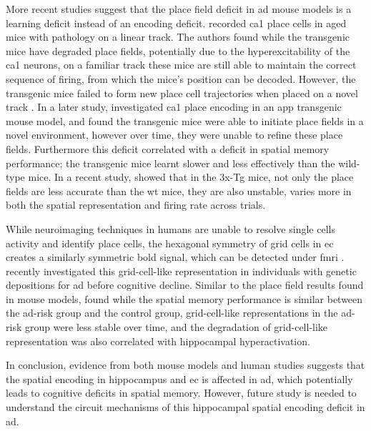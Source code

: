 More recent studies suggest that the place field deficit in \gls{ad} mouse models is a learning deficit instead of an encoding deficit. \citet{cheng13} recorded \gls{ca1} place cells in aged mice with \atau{} pathology on a linear track. The authors found while the transgenic mice have degraded place fields, potentially due to the hyperexcitability of the \gls{ca1} neurons, on a familiar track these mice are still able to maintain the correct sequence of firing, from which the mice's position can be decoded. However, the transgenic mice failed to form new place cell trajectories when placed on a novel track \citep{cheng13}. In a later study, \citet{zhao14} investigated \gls{ca1} place encoding in an \gls{app} transgenic mouse model, and found the transgenic mice were able to initiate place fields in a novel environment, however over time, they were unable to refine these place fields. Furthermore this deficit correlated with a deficit in spatial memory performance; the transgenic mice learnt slower and less effectively than the wild-type mice. In a recent study, \citet{mably17} showed that in the 3x-Tg mice, not only the place fields are less accurate than the \gls{wt} mice, they are also unstable, varies more in both the spatial representation and firing rate across trials. 

While neuroimaging techniques in humans are unable to resolve single cells activity and identify place cells, the hexagonal symmetry of grid cells in \gls{ec} creates a similarly symmetric \gls{bold} signal, which can be detected under \gls{fmri} \citep{doeller10}. \citet{kunz15} recently investigated this grid-cell-like representation in individuals with genetic depositions for \gls{ad} before cognitive decline. Similar to the place field results found in mouse models, \citet{kunz15} found while the spatial memory performance is similar between the \gls{ad}-risk group and the control group, grid-cell-like representations in the \gls{ad}-risk group were less stable over time, and the degradation of grid-cell-like representation was also correlated with hippocampal hyperactivation. 

In conclusion, evidence from both mouse models and human studies suggests that the spatial encoding in hippocampus and \gls{ec} is affected in \gls{ad}, which potentially leads to cognitive deficits in spatial memory. However, future study is needed to understand the circuit mechanisms of this hippocampal spatial encoding deficit in \gls{ad}.

